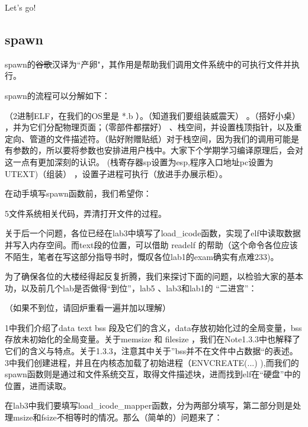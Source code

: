 Let's go!

\subsection{spawn}

spawn的\sout{谷歌}汉译为“产卵"，其作用是帮助我们调用文件系统中的可执行文件并执行。

spawn的流程可以分解如下：

\begin{itemize}
    （2进制ELF，在我们的OS里是 *.b ）。（知道我们要组装威震天）
    。（搭好小桌）
	，并为它们分配物理页面；（零部件都摆好）
	、栈空间，并设置栈顶指针，以及重定向、管道的文件描述符。（贴好附赠贴纸）对于栈空间，因为我们的调用可能是有参数的，所以要将参数也安排进用户栈中。大家下个学期学习编译原理后，会对这一点有更加深刻的认识。
	(栈寄存器sp设置为esp,程序入口地址pc设置为UTEXT)（组装）
	，设置子进程可执行（放进手办展示柜）。
\end{itemize}

在动手填写spawn函数前，我们希望你：
\begin{itemize}
    5文件系统相关代码，弄清打开文件的过程。
\end{itemize}

关于后一个问题，各位已经在lab3中填写了load_icode函数，实现了elf中读取数据并写入内存空间。而text段的位置，可以借助 readelf 的帮助（这个命令各位应该不陌生，笔者在写这部分指导书时，慨叹各位lab1的exam确实有点难233)。

为了确保各位的大楼经得起反复折腾，我们来探讨下面的问题，以检验大家的基本功，以及前几个lab是否做得“到位”，lab5 、lab3和lab1的 “二进宫”：

（如果不到位，请回炉重看一遍并加以理解）

\begin{itemize}
    1中我们介绍了data text bss 段及它们的含义，data存放初始化过的全局变量，bss存放未初始化的全局变量。关于memsize 和 filesize ，我们在Note1.3.3中也解释了它们的含义与特点。关于1.3.3，注意其中关于”bss并不在文件中占数据“的表述。
    3中我们创建进程，并且在内核态加载了初始进程（ENVCREATE(...) ),而我们的spawn函数则是通过和文件系统交互，取得文件描述块，进而找到elf在“硬盘”中的位置，进而读取。
\end{itemize}

在lab3中我们要填写load_icode_mapper函数，分为两部分填写，第二部分则是处理msize和fsize不相等时的情况。那么（简单的）问题来了：

